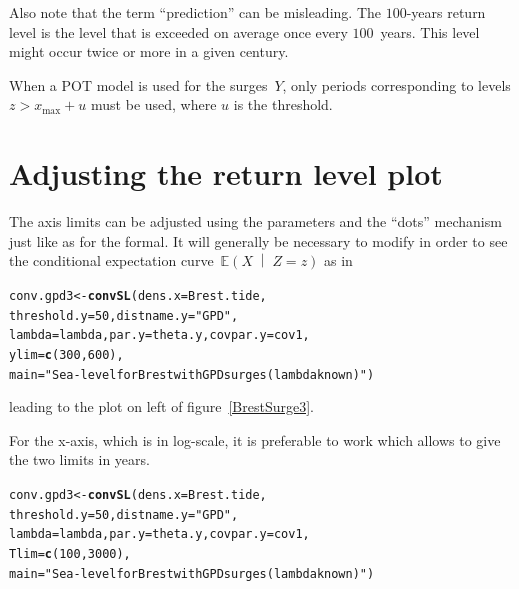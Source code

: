 \documentclass[11pt,a4paper]{report}\usepackage[]{graphicx}\usepackage[]{color}
\makeatletter
\newcommand{\hlnum}[1]{\textcolor[rgb]{0.686,0.059,0.569}{#1}}%
\newcommand{\hlstr}[1]{\textcolor[rgb]{0.192,0.494,0.8}{#1}}%
\newcommand{\hlstd}[1]{\textcolor[rgb]{0.345,0.345,0.345}{#1}}%
\newcommand{\hlkwb}[1]{\textcolor[rgb]{0.69,0.353,0.396}{#1}}%
\newcommand{\hlkwc}[1]{\textcolor[rgb]{0.333,0.667,0.333}{#1}}%
\newcommand{\hlkwd}[1]{\textcolor[rgb]{0.737,0.353,0.396}{\textbf{#1}}}%
\newenvironment{kframe}{%
 \def\at@end@of@kframe{}%
 \ifinner\ifhmode%
  \def\at@end@of@kframe{\end{minipage}}%
  \begin{minipage}{\columnwidth}%
 \fi\fi%
 \def\FrameCommand##1{\hskip\@totalleftmargin \hskip-\fboxsep
 \colorbox{shadecolor}{##1}\hskip-\fboxsep
     \hskip-\linewidth \hskip-\@totalleftmargin \hskip\columnwidth}%
 \MakeFramed {\advance\hsize-\width
   \@totalleftmargin\z@ \linewidth\hsize
   \@setminipage}}%
 {\par\unskip\endMakeFramed%
 \at@end@of@kframe}
\newenvironment{knitrout}{}{} %
\newcommand{\Esp}{\mathbb{E}}
\newcommand{\pCond}[2]{\left( #1 \;\middle\vert\; #2 \right)}
\newcommand{\Up}[1]{#1_{\mathrm{max}}}
\makeatother
\begin{document}
Also note that the term ``prediction'' can be misleading. The $100$-years
return level is the level that is exceeded on average once every
$100$~years. This level might occur twice or more in a given century.

When a POT model is used for the surges~$Y$, only periods corresponding
to levels $z > \Up{x} + u$ must be used, where $u$ is the threshold.

\section{Adjusting the return level plot}
\label{AdjustRLplot}
The axis limits can be adjusted using the \verb@ylim@ parameters and
the ``dots'' mechanism just like as for the \verb@main@ formal.  It
will generally be necessary to modify \verb@ylim@ in order to see the
conditional expectation curve~$\Esp\pCond{X}{Z=z}$ as in

\begin{knitrout}
\color{fgcolor}\begin{kframe}
\begin{alltt}
\hlstd{conv.gpd3} \hlkwb{<-} \hlkwd{convSL}\hlstd{(}\hlkwc{dens.x} \hlstd{= Brest.tide,}
                    \hlkwc{threshold.y} \hlstd{=} \hlnum{50}\hlstd{,} \hlkwc{distname.y} \hlstd{=} \hlstr{"GPD"}\hlstd{,}
                    \hlkwc{lambda} \hlstd{= lambda,} \hlkwc{par.y} \hlstd{= theta.y,} \hlkwc{covpar.y} \hlstd{= cov1,}
                    \hlkwc{ylim} \hlstd{=} \hlkwd{c}\hlstd{(}\hlnum{300}\hlstd{,} \hlnum{600}\hlstd{),}
                    \hlkwc{main} \hlstd{=} \hlstr{"Sea-level for Brest with GPD surges (lambda known)"}\hlstd{)}
\end{alltt}
\end{kframe}
\end{knitrout}

\noindent
leading to the plot on left of figure~\ref{BrestSurge3}. 

For the x-axis, which is in log-scale, it is preferable to work
\verb@Tlim@ which allows to give the two limits in years.

\begin{knitrout}
\color{fgcolor}\begin{kframe}
\begin{alltt}
\hlstd{conv.gpd3} \hlkwb{<-} \hlkwd{convSL}\hlstd{(}\hlkwc{dens.x} \hlstd{= Brest.tide,}
                    \hlkwc{threshold.y} \hlstd{=} \hlnum{50}\hlstd{,} \hlkwc{distname.y} \hlstd{=} \hlstr{"GPD"}\hlstd{,}
                    \hlkwc{lambda} \hlstd{= lambda,} \hlkwc{par.y} \hlstd{= theta.y,} \hlkwc{covpar.y} \hlstd{= cov1,}
                    \hlkwc{Tlim} \hlstd{=} \hlkwd{c}\hlstd{(}\hlnum{100}\hlstd{,} \hlnum{3000}\hlstd{),}
                    \hlkwc{main} \hlstd{=} \hlstr{"Sea-level for Brest with GPD surges (lambda known)"}\hlstd{)}
\end{alltt}
\end{kframe}
\end{knitrout}
\end{document}
